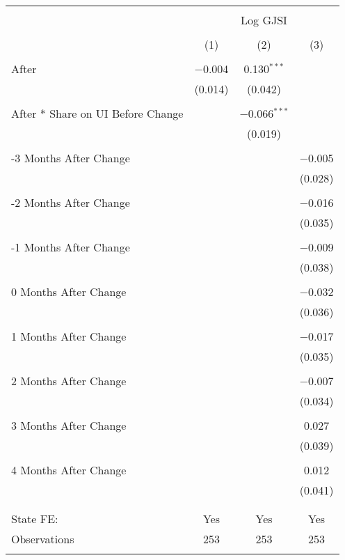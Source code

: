 
\begin{tabular}{@{\extracolsep{5pt}}lccc} 
\\[-1.8ex]\hline 
\hline \\[-1.8ex] 
 & \multicolumn{3}{c}{Log GJSI} \\ 
\cline{2-4} 
\\[-1.8ex] & (1) & (2) & (3)\\ 
\hline \\[-1.8ex] 
 After & $-$0.004 & 0.130$^{***}$ &  \\ 
  & (0.014) & (0.042) &  \\ 
  & & & \\ 
 After * Share on UI Before Change &  & $-$0.066$^{***}$ &  \\ 
  &  & (0.019) &  \\ 
  & & & \\ 
 -3 Months After Change &  &  & $-$0.005 \\ 
  &  &  & (0.028) \\ 
  & & & \\ 
 -2 Months After Change &  &  & $-$0.016 \\ 
  &  &  & (0.035) \\ 
  & & & \\ 
 -1 Months After Change &  &  & $-$0.009 \\ 
  &  &  & (0.038) \\ 
  & & & \\ 
 0 Months After Change &  &  & $-$0.032 \\ 
  &  &  & (0.036) \\ 
  & & & \\ 
 1 Months After Change &  &  & $-$0.017 \\ 
  &  &  & (0.035) \\ 
  & & & \\ 
 2 Months After Change &  &  & $-$0.007 \\ 
  &  &  & (0.034) \\ 
  & & & \\ 
 3 Months After Change &  &  & 0.027 \\ 
  &  &  & (0.039) \\ 
  & & & \\ 
 4 Months After Change &  &  & 0.012 \\ 
  &  &  & (0.041) \\ 
  & & & \\ 
\hline \\[-1.8ex] 
State FE: & Yes & Yes & Yes \\ 
Observations & 253 & 253 & 253 \\ 
\hline 
\hline \\[-1.8ex] 
\end{tabular} 
